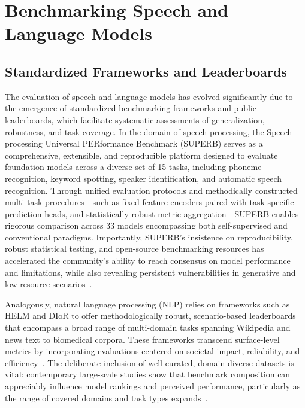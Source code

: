 \section{Benchmarking Speech and Language Models}

\subsection{Standardized Frameworks and Leaderboards}

The evaluation of speech and language models has evolved significantly due to the emergence of standardized benchmarking frameworks and public leaderboards, which facilitate systematic assessments of generalization, robustness, and task coverage. In the domain of speech processing, the Speech processing Universal PERformance Benchmark (SUPERB) serves as a comprehensive, extensible, and reproducible platform designed to evaluate foundation models across a diverse set of 15 tasks, including phoneme recognition, keyword spotting, speaker identification, and automatic speech recognition. Through unified evaluation protocols and methodically constructed multi-task procedures—such as fixed feature encoders paired with task-specific prediction heads, and statistically robust metric aggregation—SUPERB enables rigorous comparison across 33 models encompassing both self-supervised and conventional paradigms. Importantly, SUPERB’s insistence on reproducibility, robust statistical testing, and open-source benchmarking resources has accelerated the community’s ability to reach consensus on model performance and limitations, while also revealing persistent vulnerabilities in generative and low-resource scenarios~\cite{ref101,ref104}.

Analogously, natural language processing (NLP) relies on frameworks such as HELM and DIoR to offer methodologically robust, scenario-based leaderboards that encompass a broad range of multi-domain tasks spanning Wikipedia and news text to biomedical corpora. These frameworks transcend surface-level metrics by incorporating evaluations centered on societal impact, reliability, and efficiency~\cite{ref104,ref106}. The deliberate inclusion of well-curated, domain-diverse datasets is vital: contemporary large-scale studies show that benchmark composition can appreciably influence model rankings and perceived performance, particularly as the range of covered domains and task types expands~\cite{ref106}.

